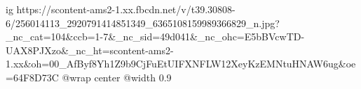  
 
 
 
 

\ifcmt
  ig https://scontent-ams2-1.xx.fbcdn.net/v/t39.30808-6/256014113_2920791414851349_6365108159989366829_n.jpg?_nc_cat=104&ccb=1-7&_nc_sid=49d041&_nc_ohc=E5bBVcwTD-UAX8PJXzo&_nc_ht=scontent-ams2-1.xx&oh=00_AfByf8Yh1Z9b9CjFuEtUIFXNFLW12XeyKzEMNtuHNAW6ug&oe=64F8D73C
  @wrap center
  @width 0.9
\fi
